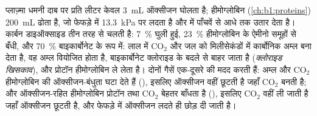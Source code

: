 \begin{proposition}\label{prop:b1:gas-exchange:transport}
प्लाज़्मा धमनी दाब पर प्रति लीटर केवल \qty{3}{mL} ऑक्सीजन घोलता है;
हीमोग्लोबिन (\cref{ch:b1:proteins}) \qty{200}{mL} ढोता है, जो फेफड़े में
\qty{13.3}{kPa} पर लदता है और  में पाँचवें से आधे तक उतार देता है।
कार्बन डाइऑक्साइड तीन तरह से चलती है: \qty{7}{\%}
घुली हुई, \qty{23}{\%} हीमोग्लोबिन के ऐमीनो समूहों से बँधी, और
\qty{70}{\%} बाइकार्बोनेट के रूप में: लाल  में \emph{} $\mathrm{CO_2}$ और जल को मिलीसेकंडों में कार्बोनिक अम्ल बना
देता है, वह अम्ल वियोजित होता है, बाइकार्बोनेट क्लोराइड के बदले  से
बाहर जाता है (\emph{क्लोराइड खिसकाव}), और प्रोटॉन हीमोग्लोबिन ले लेता
है। दोनों गैसें एक-दूसरे की मदद करती हैं: अम्ल और
$\mathrm{CO_2}$ हीमोग्लोबिन की ऑक्सीजन-बंधुता घटा देते हैं (\emph{}), इसलिए ऑक्सीजन वहीं छूटती है जहाँ $\mathrm{CO_2}$ बनती है; और
ऑक्सीजन-रहित हीमोग्लोबिन प्रोटॉन तथा $\mathrm{CO_2}$ बेहतर बाँधता है
(\emph{}), इसलिए $\mathrm{CO_2}$ वहीं ली जाती है जहाँ
ऑक्सीजन छूटती है, और फेफड़े में ऑक्सीजन लदते ही छोड़ दी जाती है।
\end{proposition}

